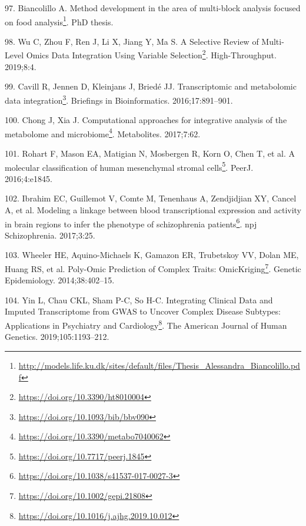 \documentclass[
  a4paper,
]{book}
\DeclareRobustCommand{\href}[2]{#2\footnote{\url{#1}}}
\newlength{\cslhangindent}
\newlength{\cslentryspacingunit} %
\newenvironment{CSLReferences}[2] %
 {%
  \setlength{\parindent}{0pt}
  \ifodd #1
  \let\oldpar\par
  \def\par{\hangindent=\cslhangindent\oldpar}
  \fi
  \setlength{\parskip}{#2\cslentryspacingunit}
 }%
 {}
\begin{document}
\begin{CSLReferences}{0}{0}
\leavevmode{}%
97. Biancolillo A. \href{http://models.life.ku.dk/sites/default/files/Thesis_Alessandra_Biancolillo.pdf}{Method development in the area of multi-block analysis focused on food analysis}. PhD thesis.

\leavevmode{}%
98. Wu C, Zhou F, Ren J, Li X, Jiang Y, Ma S. \href{https://doi.org/10.3390/ht8010004}{A {Selective Review} of {Multi}-{Level Omics Data Integration Using Variable Selection}}. High-Throughput. 2019;8:4.

\leavevmode{}%
99. Cavill R, Jennen D, Kleinjans J, Briedé JJ. \href{https://doi.org/10.1093/bib/bbv090}{Transcriptomic and metabolomic data integration}. Briefings in Bioinformatics. 2016;17:891--901.

\leavevmode{}%
100. Chong J, Xia J. \href{https://doi.org/10.3390/metabo7040062}{Computational approaches for integrative analysis of the metabolome and microbiome}. Metabolites. 2017;7:62.

\leavevmode{}%
101. Rohart F, Mason EA, Matigian N, Mosbergen R, Korn O, Chen T, et al. \href{https://doi.org/10.7717/peerj.1845}{A molecular classification of human mesenchymal stromal cells}. PeerJ. 2016;4:e1845.

\leavevmode{}%
102. Ibrahim EC, Guillemot V, Comte M, Tenenhaus A, Zendjidjian XY, Cancel A, et al. \href{https://doi.org/10.1038/s41537-017-0027-3}{Modeling a linkage between blood transcriptional expression and activity in brain regions to infer the phenotype of schizophrenia patients}. npj Schizophrenia. 2017;3:25.

\leavevmode{}%
103. Wheeler HE, Aquino-Michaels K, Gamazon ER, Trubetskoy VV, Dolan ME, Huang RS, et al. \href{https://doi.org/10.1002/gepi.21808}{Poly-Omic Prediction of Complex Traits: OmicKriging}. Genetic Epidemiology. 2014;38:402--15.

\leavevmode{}%
104. Yin L, Chau CKL, Sham P-C, So H-C. \href{https://doi.org/10.1016/j.ajhg.2019.10.012}{Integrating Clinical Data and Imputed Transcriptome from GWAS to Uncover Complex Disease Subtypes: Applications in Psychiatry and Cardiology}. The American Journal of Human Genetics. 2019;105:1193--212.


\end{CSLReferences}
\end{document}
